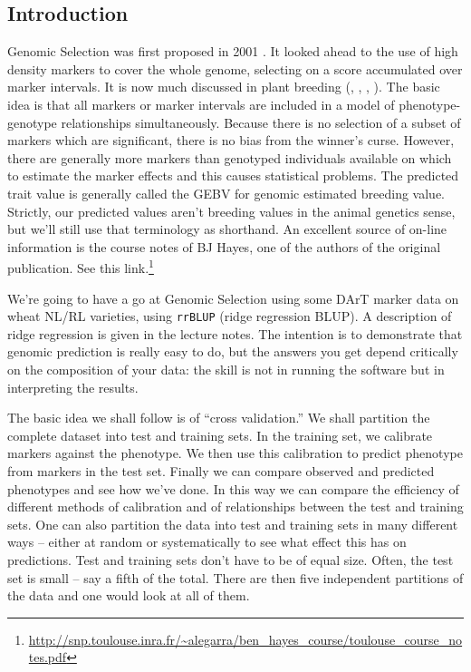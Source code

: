 \documentclass[
]{book}
\renewcommand{\href}[2]{#2\footnote{\url{#1}}}
\begin{document}
\hypertarget{introduction-4}{%
\subsection{Introduction}\label{introduction-4}}

Genomic Selection was first proposed in 2001 \citep{Meuwissen1819}. It looked ahead to the use of high density markers to cover the whole genome, selecting on a score accumulated over marker intervals. It is now much discussed in plant breeding (\citet{Bernardo2007}, \citet{Heffner2009},
\citet{Piepho2009}, \citet{Jannink2010}). The basic idea is that all markers or marker intervals are included in a model of phenotype-genotype relationships simultaneously. Because there is no selection of a subset of markers which are significant, there is no bias from the winner's curse. However, there are generally more markers than genotyped individuals available on which to estimate the marker effects and this causes statistical problems. The predicted
trait value is generally called the GEBV for genomic estimated breeding value. Strictly, our
predicted values aren't breeding values in the animal genetics sense, but we'll still use that terminology as shorthand. An excellent source of on-line information is the course notes of BJ Hayes, one of the authors of the original publication. \href{http://snp.toulouse.inra.fr/~alegarra/ben_hayes_course/toulouse_course_notes.pdf}{See this link.}

We're going to have a go at Genomic Selection using some DArT marker data on wheat
NL/RL varieties, using \texttt{rrBLUP} (ridge regression BLUP). A description of ridge regression is
given in the lecture notes. The intention is to demonstrate that genomic prediction is really
easy to do, but the answers you get depend critically on the composition of your data: the
skill is not in running the software but in interpreting the results.

The basic idea we shall follow is of ``cross validation.'' We shall partition the complete
dataset into test and training sets. In the training set, we calibrate markers against the
phenotype. We then use this calibration to predict phenotype from markers in the test set.
Finally we can compare observed and predicted phenotypes and see how we've done. In this way we can compare the efficiency of different methods of calibration and of relationships between the test and training sets. One can also partition the data into test and training sets in many different ways -- either at random or systematically to see what effect this has on predictions. Test and training sets don't have to be of equal size. Often, the test set is small -- say a fifth of the total. There are then five independent partitions of the data and one would look at all of them.
\end{document}
